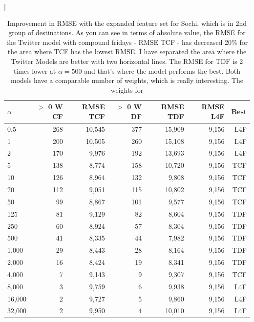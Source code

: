 \documentclass[minf,frontabs,twoside,singlespacing,parskip]{infthesis}
\begin{document}
\begin{table}[h!]]
\begin{center}
\begin{tabular}{ l | r | r | r | r | r | r}
$\alpha$ & $>$ 0 W CF & RMSE TCF & $>$ 0 W DF & RMSE TDF & RMSE L4F & Best\\
\hline
0.5 & 268 & 10,545 & 377 & 15,909 & 9,156 & L4F\\
1 & 200 & 10,505 & 260 & 15,108 & 9,156 & L4F\\
2 & 170 & 9,976 & 192 & 13,693 & 9,156 & L4F\\
\hline
5 & 138 & 8,774 & 158 & 10,720 & 9,156 & TCF\\
10 & 126 & 8,964 & 132 & 9,808 & 9,156 & TCF\\
20 & 112 & 9,051 & 115 & 10,802 & 9,156 & TCF\\
50 & 99 & 8,867 & 101 & 9,577 & 9,156 & TCF\\
125 & 81 & 9,129 & 82 & 8,604 & 9,156 & TDF\\
250 & 60 & 8,924 & 57 & 8,304 & 9,156 & TDF\\
500 & 41 & 8,335 & 44 & 7,982 & 9,156 & TDF\\
1,000 & 29 & 8,443 & 28 & 8,164 & 9,156 & TDF\\
2,000 & 16 & 8,424 & 19 & 8,341 & 9,156 & TDF\\
4,000 & 7 & 9,143 & 9 & 9,307 & 9,156 & TCF\\
\hline
8,000 & 3 & 9,759 & 6 & 9,938 & 9,156 & L4F\\
16,000 & 2 & 9,727 & 5 & 9,860 & 9,156 & L4F\\
32,000 & 2 & 9,950 & 4 & 10,010 & 9,156 & L4F\\
\end{tabular}
\end{center}
\caption{Improvement in RMSE with the expanded feature set for Sochi, which is in 2nd group of destinations.  
As you can see in terms of absolute value, the RMSE for the Twitter model with compound fridays - RMSE TCF - has decreased 20\% for the area where TCF has the lowest RMSE. I have separated the area where the Twitter Models are better with two horizontal lines. The RMSE for TDF is 2 times lower at $\alpha=500$ and that's where the model performs the best. Both models have a comparable number of weights, which is really interesting. The weights for  }
\end{table}
\end{document}
